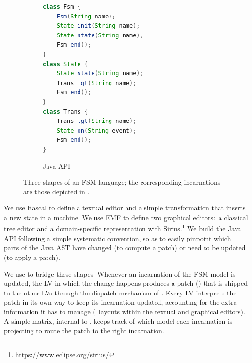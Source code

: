 \begin{figure}[bt]
	\enskip
	\vrule
	\enskip
	\begin{subfigure}[t]{.35\columnwidth}
		\vskip 0pt
		\begin{lstlisting}[label=lst:fsm-api, language=Java, numbers=none, xleftmargin=0pt, tabsize=1, aboveskip=0pt, belowskip=0pt, abovecaptionskip=0pt]
class Fsm {
	Fsm(String name);
	State init(String name);
	State state(String name);
	Fsm end();
}
class State {
	State state(String name);
	Trans tgt(String name);
	Fsm end();
}
class Trans {
	Trans tgt(String name);
	State on(String event);
	Fsm end();
}
		\end{lstlisting}
		\caption{Java API}
	\end{subfigure}
	\caption{Three shapes of an FSM language; the corresponding incarnations are those depicted in .}
	\label{fig:3fsms}
\end{figure}

We use Rascal to define a textual editor and a simple transformation that inserts a new state in a machine.
We use EMF to define two graphical editors:~a classical tree editor and a domain-specific representation with Sirius.\footnote{\url{https://www.eclipse.org/sirius/}}
We build the Java API following a simple systematic convention, so as to easily pinpoint which parts of the Java AST have changed (to compute a patch) or need to be updated (to apply a patch).

We use \prism to bridge these shapes.
Whenever an incarnation of the FSM model is updated, the LV in which the change happens produces a patch (\cf{}) that is shipped to the other LVs through the dispatch mechanism of \prism.
Every LV interprets the patch in its own way to keep its incarnation updated, accounting for the extra information it has to manage (\eg~layouts within the textual and graphical editors).
A simple matrix, internal to \prism, keeps track of which model each incarnation is projecting to route the patch to the right incarnation.



